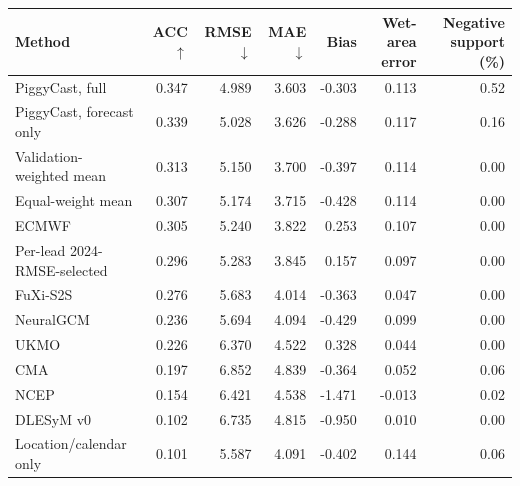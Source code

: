 \begin{tabular}{lrrrrrr}
\toprule
Method & ACC $\uparrow$ & RMSE $\downarrow$ & MAE $\downarrow$ & Bias & Wet-area error & Negative support (\%) \\
\midrule
PiggyCast, full & 0.347 & 4.989 & 3.603 & -0.303 & 0.113 & 0.52 \\
PiggyCast, forecast only & 0.339 & 5.028 & 3.626 & -0.288 & 0.117 & 0.16 \\
Validation-weighted mean & 0.313 & 5.150 & 3.700 & -0.397 & 0.114 & 0.00 \\
Equal-weight mean & 0.307 & 5.174 & 3.715 & -0.428 & 0.114 & 0.00 \\
ECMWF & 0.305 & 5.240 & 3.822 & 0.253 & 0.107 & 0.00 \\
Per-lead 2024-RMSE-selected & 0.296 & 5.283 & 3.845 & 0.157 & 0.097 & 0.00 \\
FuXi-S2S & 0.276 & 5.683 & 4.014 & -0.363 & 0.047 & 0.00 \\
NeuralGCM & 0.236 & 5.694 & 4.094 & -0.429 & 0.099 & 0.00 \\
UKMO & 0.226 & 6.370 & 4.522 & 0.328 & 0.044 & 0.00 \\
CMA & 0.197 & 6.852 & 4.839 & -0.364 & 0.052 & 0.06 \\
NCEP & 0.154 & 6.421 & 4.538 & -1.471 & -0.013 & 0.02 \\
DLESyM v0 & 0.102 & 6.735 & 4.815 & -0.950 & 0.010 & 0.00 \\
Location/calendar only & 0.101 & 5.587 & 4.091 & -0.402 & 0.144 & 0.06 \\
\bottomrule
\end{tabular}
